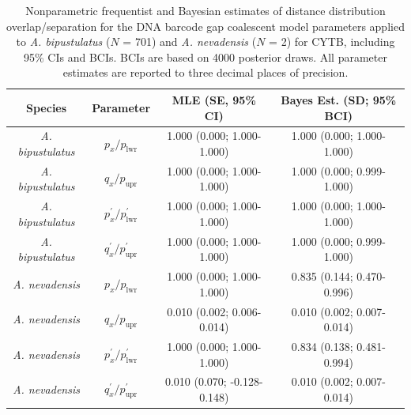 \documentclass[12pt]{article}
\begin{document}
\begin{table}[H]

\small

\centering

\caption{Nonparametric frequentist and Bayesian estimates of distance distribution overlap/separation for the DNA barcode gap coalescent model parameters applied to \textit{A. bipustulatus} ($N$ = 701) and \textit{A. nevadensis} ($N$ = 2) for CYTB, including 95\%  CIs and BCIs. BCIs are based on 4000 posterior draws. All parameter estimates are reported to three decimal places of precision.}


\begin{tabular}{cccc} \hline

\textbf{Species} & \textbf{Parameter} & \textbf{MLE (SE, 95\% CI)} & \textbf{Bayes Est. (SD; 95\% BCI)} \\  \hline
\textit{A. bipustulatus} & $p_x/p_\mathrm{lwr}$ & 1.000 (0.000; 1.000-1.000) & 1.000 (0.000; 1.000-1.000) \\
\textit{A. bipustulatus} & $q_x/p_\mathrm{upr}$ & 1.000 (0.000; 1.000-1.000) & 1.000 (0.000; 0.999-1.000) \\
\textit{A. bipustulatus} & $p^{'}_x/p^{'}_\mathrm{lwr}$ & 1.000 (0.000; 1.000-1.000) & 1.000 (0.000; 1.000-1.000)  \\
\textit{A. bipustulatus} & $q^{'}_x/p^{'}_\mathrm{upr}$ & 1.000 (0.000; 1.000-1.000) & 1.000 (0.000; 0.999-1.000) \\


\textit{A. nevadensis} & $p_x/p_\mathrm{lwr}$ & 1.000 (0.000; 1.000-1.000) & 0.835 (0.144; 0.470-0.996) \\
\textit{A. nevadensis} & $q_x/p_\mathrm{upr}$ & 0.010 (0.002; 0.006-0.014) & 0.010 (0.002; 0.007-0.014) \\
\textit{A. nevadensis} &  $p^{'}_x/p^{'}_\mathrm{lwr}$ & 1.000 (0.000; 1.000-1.000) & 0.834 (0.138; 0.481-0.994) \\
\textit{A. nevadensis} &  $q^{'}_x/p^{'}_\mathrm{upr}$ & 0.010 (0.070; -0.128-0.148) & 0.010 (0.002; 0.007-0.014) \\


\hline


\end{tabular}

\end{table}
\end{document}
